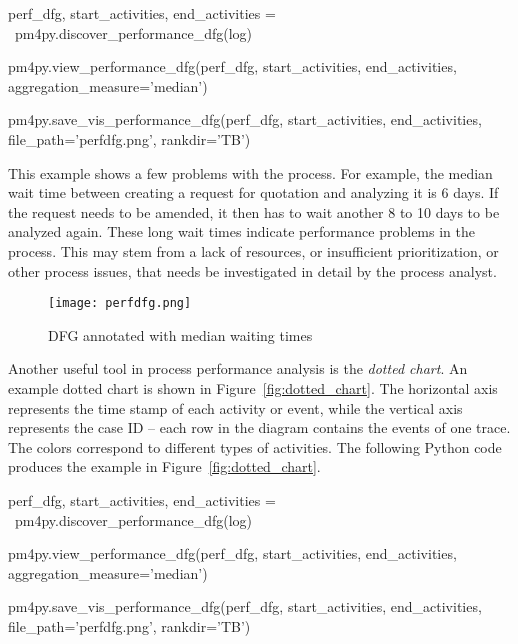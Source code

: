 \begin{samepage}
\begin{pythoncode}
perf_dfg, start_activities, end_activities = \
    pm4py.discover_performance_dfg(log)
    
pm4py.view_performance_dfg(perf_dfg, 
    start_activities, end_activities, 
    aggregation_measure='median')

pm4py.save_vis_performance_dfg(perf_dfg, 
    start_activities, end_activities, 
    file_path='perfdfg.png', rankdir='TB')
\end{pythoncode}
\end{samepage}

This example shows a few problems with the process. For example, the median wait time between creating a request for quotation and analyzing it is 6 days. If the request needs to be amended, it then has to wait another 8 to 10 days to be analyzed again. These long wait times indicate performance problems in the process. This may stem from a lack of resources, or insufficient prioritization, or other process issues, that needs be investigated in detail by the process analyst. 

\begin{figure}
\centering

\texttt{[image: perfdfg.png]}
\caption{DFG annotated with median waiting times}
\label{fig:performance_dfg}
\end{figure}

Another useful tool in process performance analysis is the \emph{dotted chart}. An example dotted chart is shown in Figure~\ref{fig:dotted_chart}. The horizontal axis represents the time stamp of each activity or event, while the vertical axis represents the case ID -- each row in the diagram contains the events of one trace. The colors correspond to different types of activities. The following Python code produces the example in Figure~\ref{fig:dotted_chart}.

\begin{samepage}
\begin{pythoncode}
perf_dfg, start_activities, end_activities = \
    pm4py.discover_performance_dfg(log)
    
pm4py.view_performance_dfg(perf_dfg, 
    start_activities, end_activities, 
    aggregation_measure='median')
    
pm4py.save_vis_performance_dfg(perf_dfg, 
    start_activities, end_activities, 
    file_path='perfdfg.png', rankdir='TB')
\end{pythoncode}
\end{samepage}

